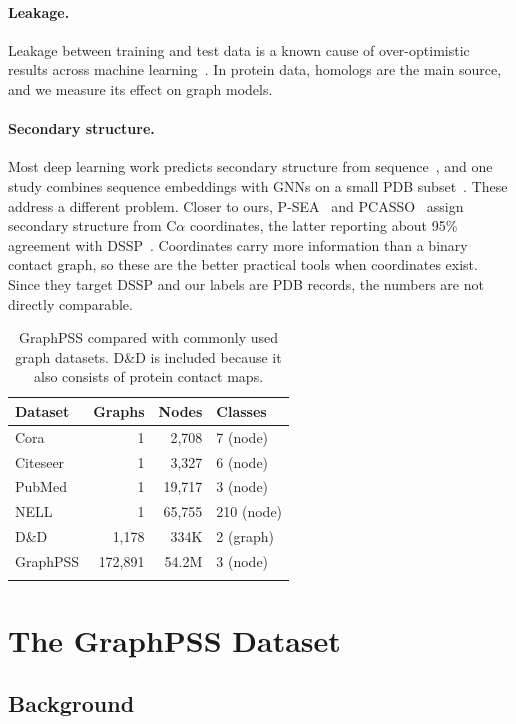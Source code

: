 \documentclass[pdflatex,sn-mathphys-num]{sn-jnl}
\begin{document}
\paragraph{Leakage.} Leakage between training and test data is a known cause of over-optimistic results across machine learning~\cite{kapoor2023leakage}. In protein data, homologs are the main source, and we measure its effect on graph models.

\paragraph{Secondary structure.} Most deep learning work predicts secondary structure from sequence~\cite{deepcnf,jpred,pssp}, and one study combines sequence embeddings with GNNs on a small PDB subset~\cite{pssgnn}. These address a different problem. Closer to ours, P-SEA~\cite{labesse1997psea} and PCASSO~\cite{law2014pcasso} assign secondary structure from C$\alpha$ coordinates, the latter reporting about 95\% agreement with DSSP~\cite{dssp}. Coordinates carry more information than a binary contact graph, so these are the better practical tools when coordinates exist. Since they target DSSP and our labels are PDB records, the numbers are not directly comparable.

\begin{table}[t]
\caption{GraphPSS compared with commonly used graph datasets. D\&D is included because it also consists of protein contact maps.}
\label{tab:datasets}
\begin{tabular}{lrrl}
\toprule
Dataset & Graphs & Nodes & Classes \\
\midrule
Cora & 1 & 2,708 & 7 (node) \\
Citeseer & 1 & 3,327 & 6 (node) \\
PubMed & 1 & 19,717 & 3 (node) \\
NELL & 1 & 65,755 & 210 (node) \\
D\&D & 1,178 & 334K & 2 (graph) \\
GraphPSS & 172,891 & 54.2M & 3 (node) \\
\botrule
\end{tabular}
\end{table}

\section{The GraphPSS Dataset}\label{sec:dataset}

\subsection{Background}
\end{document}
